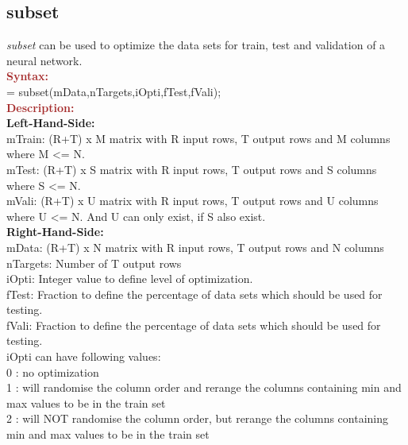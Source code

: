 \subsection{subset}

\textit{subset} can be used to optimize the data sets for train, test and validation of a neural
network.\\

\noindent \textbf{\textcolor{brown}{Syntax:}}\\

 = subset(mData,nTargets,iOpti,fTest,fVali);\\

\noindent \textbf{\textcolor{brown}{Description:}}\\

\noindent  \textbf{Left-Hand-Side:}\\
\noindent mTrain: (R+T) x M matrix with R input rows, T output rows and M columns
				where M <= N.\\
\noindent mTest:  (R+T) x S matrix with R input rows, T output rows and S columns
				where S <= N.\\
\noindent mVali:  (R+T) x U matrix with R input rows, T output rows and U columns
				where U <= N. And U can only exist, if S also exist.\\

\noindent  \textbf{Right-Hand-Side:}\\
\noindent mData: (R+T) x N matrix with R input rows, T output rows and N columns\\ 
\noindent nTargets: Number of T output rows\\ 
\noindent iOpti: Integer value to define level of optimization.\\
\noindent fTest: Fraction to define the percentage of data sets which should be used for testing. \\
\noindent fVali: Fraction to define the percentage of data sets which should be used for testing.\\

\noindent iOpti can have following values:\\
0	: no optimization\\
1	: will randomise the column order and rerange the columns containing min and max values to be in the train set\\
2	:	will NOT randomise the column order, but rerange the columns containing min and max values to be in the train set\\

